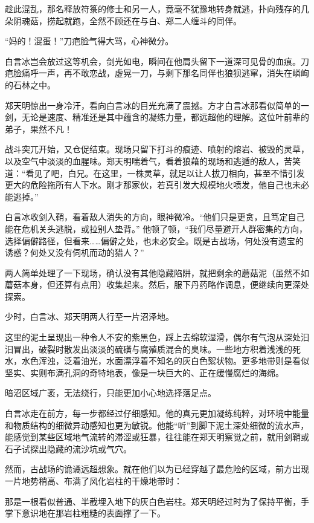 趁此混乱，那名释放符箓的修士和另一人，竟毫不犹豫地转身就逃，扑向残存的几朵阴魂菇，捞起就跑，全然不顾还在与白、郑二人缠斗的同伴。

“妈的！混蛋！”刀疤脸气得大骂，心神微分。

白言冰岂会放过这等机会，剑光如电，瞬间在他肩头留下一道深可见骨的血痕。刀疤脸痛呼一声，再不敢恋战，虚晃一刀，与剩下那名同伴也狼狈逃窜，消失在嶙峋的石林之中。

郑天明惊出一身冷汗，看向白言冰的目光充满了震撼。方才白言冰那看似简单的一剑，无论是速度、精准还是其中蕴含的凝练力量，都远超他的理解。这位叶前辈的弟子，果然不凡！

战斗突兀开始，又仓促结束。现场只留下打斗的痕迹、喷射的熔岩、被毁的灵草，以及空气中淡淡的血腥味。郑天明喘着气，看着狼藉的现场和逃遁的敌人，苦笑道：“看见了吧，白兄。在这里，一株灵草，就足以让人拔刀相向，甚至不惜引发更大的危险拖所有人下水。刚才那家伙，若真引发大规模地火喷发，他自己也未必能逃掉。”

白言冰收剑入鞘，看着敌人消失的方向，眼神微冷。“他们只是更贪，且笃定自己能在危机关头逃脱，或拉别人垫背。” 他顿了顿，“我们尽量避开人群密集的方向，选择偏僻路径，但看来……偏僻之处，也未必安全。既是古战场，何处没有遗宝的诱惑？何处又没有伺机而动的猎人？”

两人简单处理了一下现场，确认没有其他隐藏陷阱，就把剩余的蘑菇泥（虽然不如蘑菇本身，但还算有点用）收集起来。然后，服下丹药略作调息，便继续向更深处探索。

\vspace{2em}

少时，白言冰、郑天明两人行至一片沼泽地。

这里的泥土呈现出一种令人不安的紫黑色，踩上去绵软湿滑，偶尔有气泡从深处汩汩冒出，破裂时散发出淡淡的硫磺与腐殖质混合的臭味。一些地方积着浅浅的死水，水色浑浊，泛着油光，水面漂浮着不知名的灰白色絮状物。更多地带则是看似坚实、实则布满孔洞的奇特地表，像是一块巨大的、正在缓慢腐烂的海绵。

暗沼区域广袤，无法绕行，只能更加小心地选择落足点。

白言冰走在前方，每一步都经过仔细感知。他的真元更加凝练纯粹，对环境中能量和物质结构的细微异动感知也更为敏锐。他能“听”到脚下泥土深处细微的流水声，能感觉到某些区域地气流转的滞涩或狂暴，往往能在郑天明察觉之前，就用剑鞘或石子试探出隐藏的流沙坑或气穴。

然而，古战场的诡谲远超想象。就在他们以为已经穿越了最危险的区域，前方出现一片地势稍高、布满了风化岩柱的干燥地带时：

那是一根看似普通、半截埋入地下的灰白色岩柱。郑天明经过时为了保持平衡，手掌下意识地在那岩柱粗糙的表面撑了一下。

